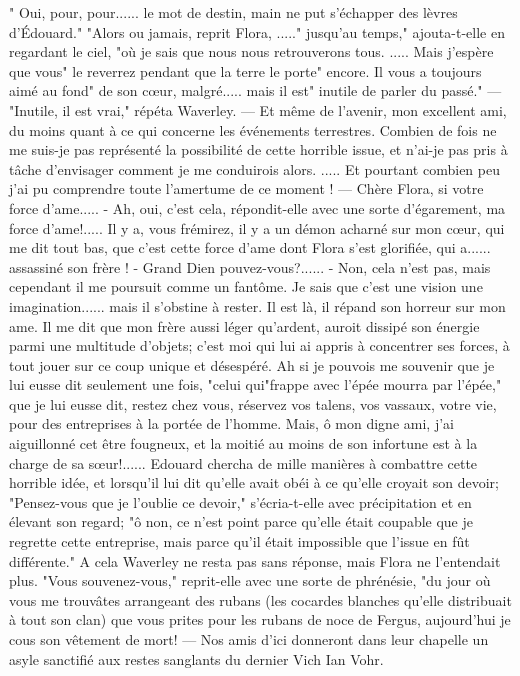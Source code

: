 " Oui, pour, pour...... le mot de destin, main ne put s'échapper des lèvres d'Édouard."
"Alors ou jamais, reprit Flora, ....." jusqu'au temps," ajouta-t-elle en regardant le ciel, "où je sais que nous nous retrouverons tous. ..... Mais j'espère que vous" le reverrez pendant que la terre le porte" encore. Il vous a toujours aimé au fond" de son cœur, malgré..... mais il est" inutile de parler du passé."
— "Inutile, il est vrai," répéta Waverley.
— Et même de l'avenir, mon excellent ami, du moins quant à ce qui concerne les événements terrestres. Combien de fois ne me suis-je pas représenté la possibilité de cette horrible issue, et n'ai-je pas pris à tâche d'envisager comment je me conduirois alors. ..... Et pourtant combien peu j'ai pu comprendre toute l'amertume de ce moment !
— Chère Flora, si votre force d'ame.....\setcounter{page}{380} - Ah, oui, c'est cela, répondit-elle avec une sorte d'égarement, ma force d'ame!..... Il y a, vous frémirez, il y a un démon acharné sur mon cœur, qui me dit tout bas, que c'est cette force d'ame dont Flora s'est glorifiée, qui a...... assassiné son frère !
- Grand Dien pouvez-vous?......
- Non, cela n'est pas, mais cependant il me poursuit comme un fantôme. Je sais que c'est une vision une imagination...... mais il s'obstine à rester. Il est là, il répand son horreur sur mon ame. Il me dit que mon frère aussi léger qu'ardent, auroit dissipé son énergie parmi une multitude d'objets; c'est moi qui lui ai appris à concentrer ses forces, à tout jouer sur ce coup unique et désespéré. Ah si je pouvois me souvenir que je lui eusse dit seulement une fois, "celui qui"frappe avec l'épée mourra par l'épée," que je lui eusse dit, restez chez vous, réservez vos talens, vos vassaux, votre vie, pour des entreprises à la portée de l'homme. Mais, ô mon digne ami, j'ai aiguillonné cet être fougneux, et la moitié au moins de son infortune est à la charge de sa sœur!......
Edouard chercha de mille manières à combattre cette horrible idée, et lorsqu'il\setcounter{page}{381} lui dit qu'elle avait obéi à ce qu'elle croyait son devoir; "Pensez-vous que je l'oublie ce devoir," s'écria-t-elle avec précipitation et en élevant son regard; "ô non, ce n'est point parce qu'elle était coupable que je regrette cette entreprise, mais parce qu'il était impossible que l'issue en fût différente."
A cela Waverley ne resta pas sans réponse, mais Flora ne l'entendait plus.
"Vous souvenez-vous," reprit-elle avec une sorte de phrénésie, "du jour où vous me trouvâtes arrangeant des rubans (les cocardes blanches qu'elle distribuait à tout son clan) que vous prites pour les rubans de noce de Fergus, aujourd'hui je cous son vêtement de mort! — Nos amis d'ici donneront dans leur chapelle un asyle sanctifié aux restes sanglants du dernier Vich Ian Vohr.
